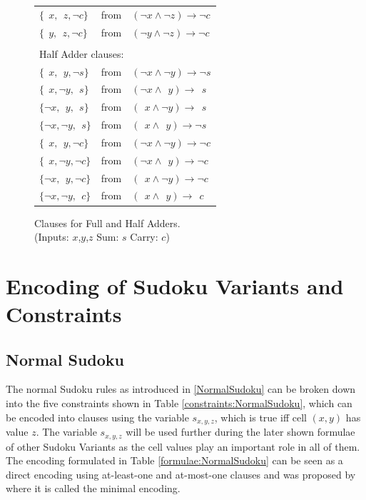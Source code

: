 \begin{figure}
\begin{tabular}{l l l}
     $\{~~x, ~~z, \neg c\}$          & from & $(\neg x      \land \neg z)   \rightarrow \neg c$ \\
     $\{~~y, ~~z, \neg c\}$          & from & $(\neg y      \land \neg z)   \rightarrow \neg c$ \\
     &&\\
     \multicolumn {3}{l}{Half Adder clauses:}\\
     $\{~~x, ~~y, \neg s\}$          & from & $(\neg x      \land \neg y)   \rightarrow \neg s$ \\
     $\{~~x, \neg y, ~~s\}$          & from & $(\neg x      \land ~~y)      \rightarrow ~~s$ \\
     $\{\neg x, ~~y, ~~s\}$          & from & $(~~x         \land \neg y)   \rightarrow ~~s$ \\
     $\{\neg x, \neg y, ~~s\}$       & from & $(~~x         \land ~~y)   \rightarrow \neg s$ \\
     $\{~~x, ~~y, \neg c\}$          & from & $(\neg x      \land \neg y)   \rightarrow \neg c$ \\
     $\{~~x, \neg y, \neg c\}$          & from & $(\neg x      \land ~~y)      \rightarrow \neg c$ \\
     $\{\neg x, ~~y, \neg c\}$          & from & $(~~x         \land \neg y)   \rightarrow \neg c$ \\
     $\{\neg x, \neg y, ~~c\}$       & from & $(~~x         \land ~~y)   \rightarrow ~~c$ \\
    \end{tabular}
    \caption{Clauses for Full and Half Adders.\\
    (Inputs: $x$,$y$,$z$  Sum: $s$  Carry: $c$)}
    \label{AdderNetworkClauses}
\end{figure}

\newpage
\section{Encoding of Sudoku Variants and Constraints}

\subsection{Normal Sudoku}
The normal Sudoku rules as introduced in \ref{NormalSudoku} can be broken down into the five constraints shown in Table \ref{constraints:NormalSudoku}, which can be encoded into clauses using the variable $s_{x,y,z}$, which is true iff cell $(x,y)$ has value $z$. The variable $s_{x,y,z}$ will be used further during the later shown formulae of other Sudoku Variants as the cell values play an important role in all of them. The encoding formulated in Table \ref{formulae:NormalSudoku} can be seen as a direct encoding using at-least-one and at-most-one clauses and was proposed by \cite{Lynce2006SudokuAsASATProblem} where it is called the minimal encoding.\\


